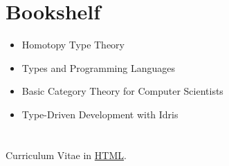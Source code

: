 \section{Bookshelf}
\begin{itemize}
  \item Homotopy Type Theory
  \item Types and Programming Languages
  \item Basic Category Theory for Computer Scientists
  \item Type-Driven Development with Idris
\end{itemize}

\section*{}
Curriculum Vitae in \href{https://nobodytells.me/cv/web/cv.html}{HTML}.


